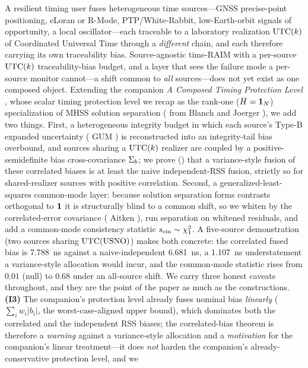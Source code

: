 A resilient timing user fuses heterogeneous time sources---GNSS precise-point
positioning, eLoran or R-Mode, PTP/White-Rabbit, low-Earth-orbit signals of
opportunity, a local oscillator---each traceable to a laboratory realization
$\mathrm{UTC}(k){}$ of Coordinated Universal Time through a \emph{different} chain, and each
therefore carrying its own traceability bias. Source-agnostic time-RAIM with a
per-source $\mathrm{UTC}(k){}$ traceability-bias budget, and a layer that sees the failure
mode a per-source monitor cannot---a shift common to \emph{all} sources---does not
yet exist as one composed object. Extending the companion \emph{A Composed Timing
Protection Level} \citep{baweja2026cti}, whose scalar timing protection level we
recap as the rank-one ($H=\bm 1_N$) specialization of MHSS solution separation
(\Cited{} from Blanch \citep{blanch2015} and Joerger \citep{joerger2014}), we add
two things. First, a heterogeneous integrity budget in which each source's Type-B
expanded uncertainty (\Cited{} GUM \citep{jcgm100}) is reconstructed into an
integrity-tail bias overbound, and sources sharing a $\mathrm{UTC}(k){}$ realizer are coupled
by a positive-semidefinite bias cross-covariance $\Sigma_{b}{}$; we prove
(\Proven{}) that a variance-style fusion of these correlated biases is at least the
naive independent-RSS fusion, strictly so for shared-realizer sources with positive
correlation. Second, a generalized-least-squares common-mode layer: because
solution separation forms contrasts orthogonal to $\bm 1{}$ it is structurally
blind to a common shift, so we whiten by the correlated-error covariance (\Cited{}
Aitken \citep{aitken1935}), run separation on whitened residuals, and add a
common-mode consistency statistic $s_{\mathrm{cm}}{}\sim\chi^2_1$. A five-source demonstration
(two sources sharing $\mathrm{UTC}{}(\mathrm{USNO})$) makes both concrete: the correlated
fused bias is \SI{7.788}{\nano\second} against a naive-independent
\SI{6.681}{\nano\second}, a \SI{1.107}{\nano\second} understatement a
variance-style allocation would incur, and the common-mode statistic rises from
$0.01$ (null) to $0.68$ under an all-source shift. We carry three honest caveats
throughout, and they are the point of the paper as much as the constructions.
\textbf{(I3)} The companion's protection level already fuses nominal bias
\emph{linearly} ($\sum_i w_i|b_i|$, the worst-case-aligned upper bound),
which dominates both the correlated and the independent RSS biases; the
correlated-bias theorem is therefore a \emph{warning} against a variance-style
allocation and a \emph{motivation} for the companion's linear treatment---it does
\emph{not} harden the companion's already-conservative protection level, and we
